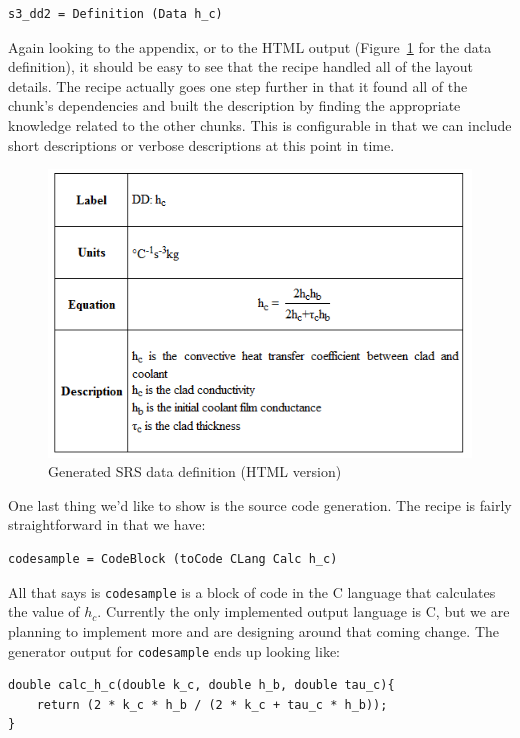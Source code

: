 \documentclass[preprint, 10pt]{sigplanconf}
\begin{document}
\begin{lstlisting}
s3_dd2 = Definition (Data h_c)
\end{lstlisting}

Again looking to the appendix, or to the HTML output (Figure~\ref{fig:HTML_s3} for
the data definition), it should be easy to see that the recipe handled all of
the layout details. The recipe actually goes one step further in that it found
all of the chunk's dependencies and built the description by finding the
appropriate knowledge related to the other chunks. This is configurable in that
we can include short descriptions or verbose descriptions at this point in time.

\begin{figure}
\includegraphics[scale=0.6]{HTML_s3.png}
\caption{Generated SRS data definition (HTML version)}
\label{fig:HTML_s3}
\end{figure}

One last thing we'd like to show is the source code generation. The recipe is
fairly straightforward in that we have:

\begin{lstlisting}
codesample = CodeBlock (toCode CLang Calc h_c)
\end{lstlisting}

All that says is \verb|codesample| is a block of code in the C language that
calculates the value of $h_c$. Currently the only implemented output language is
C, but we are planning to implement more and are designing around that coming
change. The generator output for \verb|codesample| ends up looking like:

\begin{lstlisting}[frame=single, 
  showstringspaces=false, basicstyle=\scriptsize]
double calc_h_c(double k_c, double h_b, double tau_c){
    return (2 * k_c * h_b / (2 * k_c + tau_c * h_b));
}
\end{lstlisting}
\end{document}
